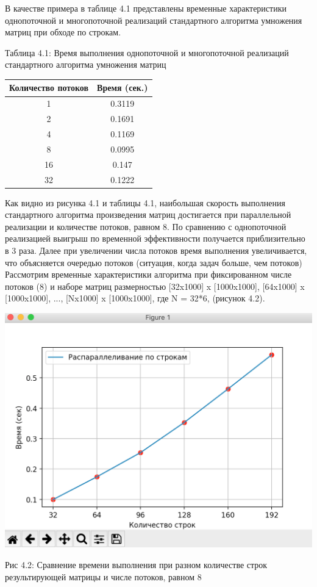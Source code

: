 \documentclass[12pt]{report}
\begin{document}
В качестве примера в таблице 4.1 представлены временные характеристики однопоточной и многопоточной реализаций стандартного алгоритма умножения матриц при обходе по строкам.

\begin{center}
	\centering
	\caption{Таблица 4.1: Время выполнения однопоточной и многопоточной реализаций стандартного алгоритма умножения матриц}
	\begin{tabular}{|c c|}
		\hline
		Количество потоков & Время  (сек.) \\ [0.5ex] 
 		\hline\hline
		1 & 0.3119\\
 		\hline
 		2 & 0.1691\\
 		\hline
 		4 & 0.1169\\
 		\hline
		8 & 0.0995\\
		\hline
		16 & 0.147\\
		\hline
		32 & 0.1222\\
		\hline
		\end{tabular}
\end{center} 

Как видно из рисунка 4.1 и таблицы 4.1, наибольшая скорость выполнения стандартного алгоритма произведения матриц достигается при параллельной реализации и количестве потоков, равном 8. По сравнению с однопоточной реализацией выигрыш по временной эффективности получается приблизительно в 3 раза. Далее при увеличении числа потоков время выполнения увеличивается, что объясняется очередью потоков (ситуация, когда задач больше, чем потоков)
Рассмотрим временные характеристики алгоритма при фиксированном числе потоков (8) и наборе матриц размерностью [32x1000] x [1000x1000], [64x1000] x [1000x1000], ..., [Nx1000] x [1000x1000], где N = 32*6, (рисунок 4.2).

\begin{center}
		\includegraphics[scale=0.6]{pics/Parallel2.png}
		
			Рис 4.2: Сравнение времени выполнения при разном количестве строк результирующей матрицы и числе потоков, равном 8
\end{center}
\end{document}
